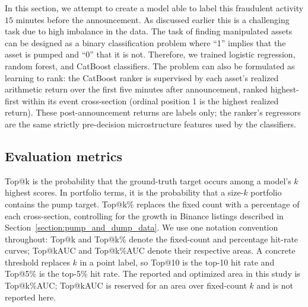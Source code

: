 \documentclass{ieeeaccess}
\begin{document}
In this section, we attempt to create a model able to label this fraudulent activity $15$ minutes before the announcement. As discussed earlier this is a challenging task due to high imbalance in the data. The task of finding manipulated assets can be designed as a binary classification problem where ``1'' implies that the asset is pumped and ``0'' that it is not. Therefore, we trained logistic regression, random forest, and CatBoost classifiers. The problem can also be formulated as learning to rank: the CatBoost ranker is supervised by each asset's realized arithmetic return over the first five minutes after announcement, ranked highest-first within its event cross-section (ordinal position 1 is the highest realized return). These post-announcement returns are labels only; the ranker's regressors are the same strictly pre-decision microstructure features used by the classifiers.

\subsection{Evaluation metrics}
\label{sec:evaluation_metrics}
Top@k is the probability that the ground-truth target occurs among a model's $k$ highest scores. In portfolio terms, it is the probability that a size-$k$ portfolio contains the pump target. Top@k\% replaces the fixed count with a percentage of each cross-section, controlling for the growth in Binance listings described in Section~\ref{section:pump_and_dump_data}. We use one notation convention throughout: Top@k and Top@k\% denote the fixed-count and percentage hit-rate curves; Top@kAUC and Top@k\%AUC denote their respective areas. A concrete threshold replaces $k$ in a point label, so Top@10 is the top-10 hit rate and Top@5\% is the top-5\% hit rate. The reported and optimized area in this study is Top@k\%AUC; Top@kAUC is reserved for an area over fixed-count $k$ and is not reported here.
\end{document}
